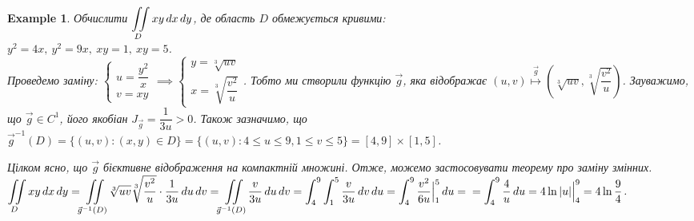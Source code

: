 \documentclass[a4paper, 10pt]{article}
\theoremstyle{theoremdd}
\theoremstyle{theoremdd}
\theoremstyle{theoremdd}
\theoremstyle{theoremdd}
\theoremstyle{theoremdd}
\newtheorem{example}[theorem]{Example}
\theoremstyle{theoremdd}
\theoremstyle{theoremdd}
\theoremstyle{theoremdd}
\theoremstyle{theoremdd}
\theoremstyle{theoremdd}
\theoremstyle{theoremdd}
\theoremstyle{theoremdd}
\theoremstyle{theoremdd}
\theoremstyle{theoremdd}
\theoremstyle{theoremdd}
\begin{document}
\begin{example}
Обчислити $\displaystyle\iint\displaylimits_D xy\,dx\,dy$, де область $D$ обмежується кривими:\\
$y^2 = 4x,\ y^2 = 9x,\ xy = 1,\ xy = 5$.\\
Проведемо заміну: $\begin{cases} u = \dfrac{y^2}{x} \\ v = xy \end{cases} \implies \begin{cases} y = \sqrt[3]{uv} \\ x = \sqrt[3]{\dfrac{v^2}{u}} \end{cases}$. Тобто ми створили функцію $\vec{g}$, яка відображає $(u,v) \overset{\vec{g}}{\mapsto} \left( \sqrt[3]{uv}, \sqrt[3]{\dfrac{v^2}{u}}\right)$. Зауважимо, що $\vec{g} \in C^1$, його якобіан $J_{\vec{g}} = \dfrac{1}{3u} > 0$. Також зазначимо, що $\vec{g}^{-1}(D) = \{(u,v): (x,y) \in D\} = \{ (u,v): 4 \leq u \leq 9, 1 \leq v \leq 5\} = [4,9] \times [1,5]$.
\begin{figure}[H]
\centering
{}
\qquad
{}
\end{figure}
Цілком ясно, що $\vec{g}$ бієктивне відображення на компактній множині. Отже, можемо застосовувати теорему про заміну змінних.\\
$\displaystyle\iint\displaylimits_D xy\,dx\,dy = \iint\displaylimits_{\vec{g}^{-1}(D)} \sqrt[3]{uv} \sqrt[3]{\dfrac{v^2}{u}} \cdot \dfrac{1}{3u}\,du\,dv = \iint\displaylimits_{\vec{g}^{-1}(D)} \dfrac{v}{3u}\,du\,dv = \int_4^9 \int_1^5 \dfrac{v}{3u}\,dv\,du = \int_4^9 \dfrac{v^2}{6u} \Big|_1^5\,du = \\
 = \int_4^9 \dfrac{4}{u}\,du = 4 \ln |u| \Big|_4^9 = 4 \ln \dfrac{9}{4}$.
\end{example}
\end{document}
